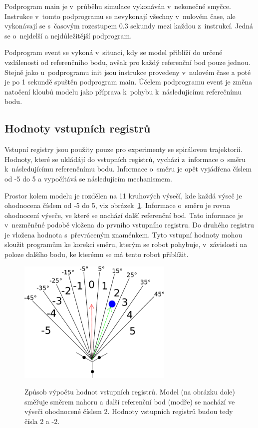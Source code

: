 Podprogram main je v~průběhu simulace vykonáván v~nekonečné smyčce.
Instrukce v~tomto podprogramu se nevykonají všechny v~nulovém čase, ale vykonávají se s~časovým rozestupem 0.3 sekundy mezi každou z~instrukcí.
Jedná se o~nejdelší a nejdůležitější podprogram.

Podprogram event se vykoná v~situaci, kdy se model přiblíží do určené vzdálenosti od referenčního bodu, avšak pro každý referenční bod pouze jednou.
Stejně jako u~podprogramu init jsou instrukce provedeny v~nulovém čase a poté je po 1 sekundě spuštěn podprogram main.
Účelem podprogramu event je změna natočení kloubů modelu jako příprava k~pohybu k~následujícímu referečnímu bodu.

\subsection{Hodnoty vstupních registrů}
Vstupní registry jsou použity pouze pro experimenty se spirálovou trajektorií.
Hodnoty, které se ukládájí do vstupních registrů, vychází z~informace o~směru k~následujícímu referenčnímu bodu.
Informace o~směru je opět vyjádřena číslem od -5 do 5 a vypočítává se následujícím mechanismem.

Prostor kolem modelu je rozdělen na 11 kruhových výsečí, kde každá výseč je ohodnocena číslem od -5 do 5, viz obrázek~\ref{fig:kruhove_vysece}.
Informace o~směru je rovna ohodnocení výseče, ve které se nachází další referenční bod.
Tato informace je v~nezměněné podobě vložena do prvního vstupního registru.
Do druhého registru je vložena hodnota s~převráceným znaménkem.
Tyto vstupní hodnoty mohou sloužit programům ke korekci směru, kterým se robot pohybuje, v~závislosti na poloze dalšího bodu, ke kterému se má tento robot přiblížit.


\begin{figure}[h]
    \centering
    {\includegraphics[width=20em]{obrazky/reference_direction_angles.pdf}}
    \caption[Způsob výpočtu hodnot vstupních registrů]{
    Způsob výpočtu hodnot vstupních registrů.
    Model (na obrázku dole) směřuje směrem nahoru a další referenční bod (modře) se nachází ve výseči ohodnocené číslem 2.
    Hodnoty vstupních registrů budou tedy čísla 2 a -2.
    }
    \label{fig:kruhove_vysece}
\end{figure}

